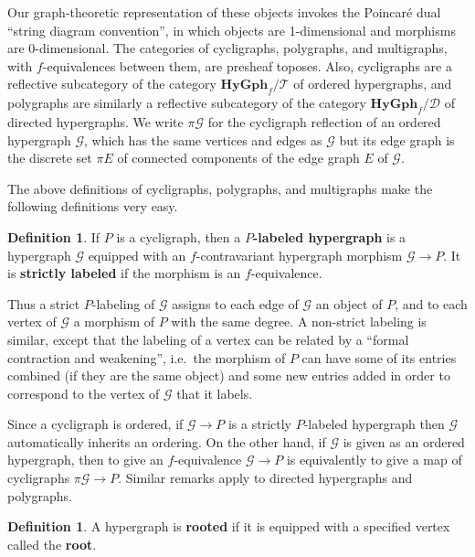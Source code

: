 \documentclass{article}
\theoremstyle{definition}
\newtheorem{defn}[thm]{Definition}
\theoremstyle{remark}
\def\G{\mathcal{G}}
\def\hy{\mathbf{HyGph}}
\def\thy{\mathcal{T}}
\def\dhy{\mathcal{D}}
\begin{document}
Our graph-theoretic representation of these objects invokes the Poincar\'e dual ``string diagram convention'', in which objects are 1-dimensional and morphisms are 0-dimensional.
The categories of cycligraphs, polygraphs, and multigraphs, with $f$-equivalences between them, are presheaf toposes.
Also, cycligraphs are a reflective subcategory of the category $\hy_f/\thy$ of ordered hypergraphs, and polygraphs are similarly a reflective subcategory of the category $\hy_f/\dhy$ of directed hypergraphs.
We write $\pi \G$ for the cycligraph reflection of an ordered hypergraph $\G$, which has the same vertices and edges as $\G$ but its edge graph is the discrete set $\pi E$ of connected components of the edge graph $E$ of $\G$.

The above definitions of cycligraphs, polygraphs, and multigraphs make the following definitions very easy.

\begin{defn}\label{thm:labeled}
  If $P$ is a cycligraph, then a \textbf{$P$-labeled hypergraph} is a hypergraph $\G$ equipped with an $f$-contravariant hypergraph morphism $\G\to P$.
  It is \textbf{strictly labeled} if the morphism is an $f$-equivalence.
\end{defn}

Thus a strict $P$-labeling of $\G$ assigns to each edge of $\G$ an object of $P$, and to each vertex of $\G$ a morphism of $P$ with the same degree.
A non-strict labeling is similar, except that the labeling of a vertex can be related by a ``formal contraction and weakening'', i.e.\ the morphism of $P$ can have some of its entries combined (if they are the same object) and some new entries added in order to correspond to the vertex of $\G$ that it labels.

Since a cycligraph is ordered, if $\G\to P$ is a strictly $P$-labeled hypergraph then $\G$ automatically inherits an ordering.
On the other hand, if $\G$ is given as an ordered hypergraph, then to give an $f$-equivalence $\G\to P$ is equivalently to give a map of cycligraphs $\pi \G \to P$.
Similar remarks apply to directed hypergraphs and polygraphs.

\begin{defn}
  A hypergraph is \textbf{rooted} if it is equipped with a specified vertex called the \textbf{root}.
\end{defn}
\end{document}
